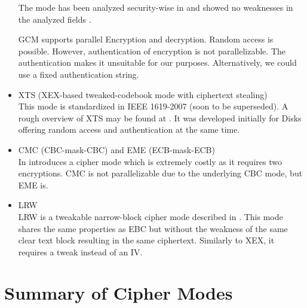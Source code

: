 \begin{itemize}
	The mode has been analyzed security-wise in \citeyear{mcgrew2004security} and showed no weaknesses in the analyzed fields \cite{mcgrew2004security}. 
	
	GCM supports parallel Encryption and decryption. Random access is possible. However, authentication of encryption is not parallelizable. The authentication makes it unsuitable for our purposes. Alternatively, we could use a fixed authentication string.
	\item XTS (XEX-based tweaked-codebook mode with ciphertext stealing)\\
	This mode is standardized in IEEE 1619-2007 (soon to be superseded). A rough overview of XTS may be found at \cite{Martin2010}. It was developed initially for Disks offering random access and authentication at the same time. 
	\item CMC (CBC-mask-CBC) and EME (ECB-mask-ECB)\\ 
	In \cite{Halevi:2003} \citeauthor{Halevi:2003} introduces a cipher mode which is extremely costly as it requires two encryptions. CMC is not parallelizable due to the underlying CBC mode, but EME is. 
	\item LRW\\
	LRW is a tweakable narrow-block cipher mode described in \cite{tschorsch:translayeranon}. This mode shares the same properties as EBC but without the weakness of the same clear text block resulting in the same ciphertext. Similarly to XEX, it requires a tweak instead of an IV.
\end{itemize}

\section{Summary of Cipher Modes}

